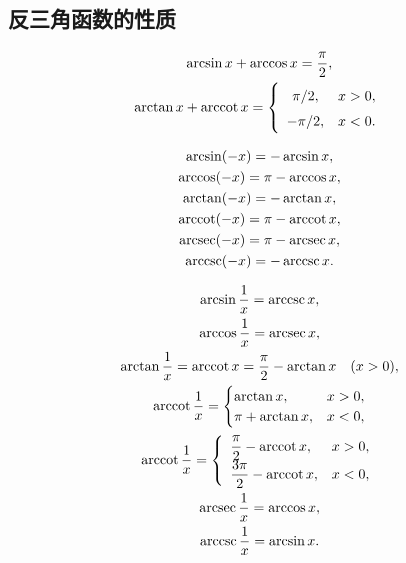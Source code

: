 \subsection{反三角函数的性质}
\begin{theorem}[余角公式]
\begin{gather}
	\arcsin x + \arccos x = \frac{\pi}{2}, \\
	\arctan x + \arccot x = \left\{ \begin{array}{cl}
		\pi/2, & x > 0, \\
		-\pi/2, & x < 0.
	\end{array} \right.
\end{gather}
\end{theorem}

\begin{theorem}[负数关系]
\begin{gather}
	\arcsin(-x) = -\arcsin x, \\
	\arccos(-x) = \pi-\arccos x, \\
	\arctan(-x) = -\arctan x, \\
	\arccot(-x) = \pi-\arccot x, \\
	\arcsec(-x) = \pi-\arcsec x, \\
	\arccsc(-x) = -\arccsc x.
\end{gather}
\end{theorem}

\begin{theorem}[倒数关系]
\begin{gather}
	\arcsin\frac{1}{x} = \arccsc x, \\
	\arccos\frac{1}{x} = \arcsec x, \\
	\arctan\frac{1}{x} = \arccot x
		= \frac{\pi}{2} - \arctan x
	\quad(x>0), \\
	\arccot\frac{1}{x} = \begin{cases}
		\arctan x, & x>0, \\
		\pi+\arctan x, & x<0,
		\end{cases} \\
	\arccot\frac{1}{x} = \left\{ \def\arraystretch{1.5} \begin{array}{lc}
		\dfrac{\pi}{2} - \arccot x, & x>0, \\
		\dfrac{3\pi}{2} - \arccot x, & x<0,
		\end{array} \right. \\
	\arcsec\frac{1}{x} = \arccos x, \\
	\arccsc\frac{1}{x} = \arcsin x.
\end{gather}
\end{theorem}

